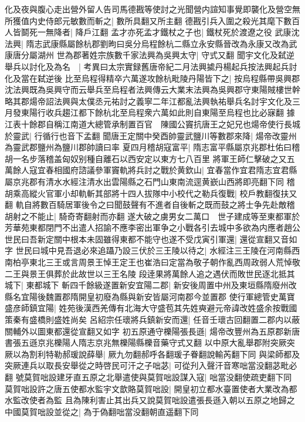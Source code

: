 化及夜與腹心走出營外留人告司馬德戡等使討之光聞營内諠知事覺即襲化及營空無所獲值内史侍郎元敏數而斬之|{
	數所具翻又所主翻}
德戡引兵入圍之殺光其麾下數百人皆鬬死一無降者|{
	降戶江翻}
孟才亦死孟才鐵杖之子也|{
	鐵杖死於渡遼之役}
武康沈法興|{
	隋志武康縣屬餘杭郡劉昫曰吳分烏程餘杭二縣立永安縣晉改為永康又改為武康唐分屬湖州}
世為郡著姓宗族數千家法興為吳興太守|{
	守式又翻}
聞宇文化及弑逆舉兵以討化及為名　|{
	考異曰太宗實録舊唐帝紀二月法興㨿丹楊起兵按法興起兵討化及當在弑逆後}
比至烏程得精卒六萬遂攻餘杭毗陵丹陽皆下之|{
	按烏程縣帶吳興郡沈法興既為吳興守而云舉兵至烏程者法興傳云大業末法興為吳興郡守東陽賊樓世幹略其郡煬帝詔法興與太僕丞元祐討之義寧二年江都亂法興執祐舉兵名討宇文化及三月發東陽行收兵趨江都下餘杭北至烏程衆六萬如此則自東陽至烏程也比必寐翻}
據江表十餘郡自稱江南道大總管承制置百官　陳國公竇抗唐王之妃兄也煬帝使行長城於靈武|{
	行循行也音下孟翻}
聞唐王定關中癸酉帥靈武鹽川等數郡來降|{
	煬帝改靈州為靈武郡鹽州為鹽川郡帥讀曰率}
夏四月稽胡寇富平|{
	隋志富平縣屬京兆郡杜佑曰稽胡一名步落稽盖匈奴别種自離石以西安定以東方七八百里}
將軍王師仁擊破之又五萬餘人寇宜春相國府諮議參軍竇軌將兵討之戰於黄欽山|{
	宜春當作宜君隋志宜君縣屬京兆郡有清水水經注清水出雲陽縣之石門山東南流逕黄嶔山西將即亮翻下同}
稽胡乘高縱火官軍小却軌斬其部將十四人拔隊中小校代之勒兵復戰|{
	校戶教翻復扶又翻}
軌自將數百騎居軍後令之曰聞鼓聲有不進者自後斬之既而鼓之將士争先赴敵稽胡射之不能止|{
	騎奇寄翻射而亦翻}
遂大破之虜男女二萬口　世子建成等至東都軍於芳華苑東都閉門不出遣人招諭不應李密出軍争之小戰各引去城中多欲為内應者趙公世民曰吾新定關中根本未固雖得東都不能守也遂不受戊寅引軍還|{
	還從宣翻又音如字}
世民曰城中見吾退必來追躡乃設三伏於三王陵以待之|{
	水經注三王陵在河南縣西南柏亭東北三王或言周景王悼王定王也崔浩曰定當為敬子朝作亂西周政弱人荒悼敬二王與景王俱葬於此故世以三王名陵}
段逹果將萬餘人追之遇伏而敗世民逐北抵其城下|{
	東都城下}
斬四千餘級遂置新安宜陽二郡|{
	新安後周置中州及東垣縣隋廢州改縣名宜陽後魏置郡隋開皇初廢為縣與新安皆屬河南郡今並置郡}
使行軍總管史萬寶盛彦師鎮宜陽|{
	姓苑後漢西羌傳有北海大守盛苞其先姓奭避元帝諱改姓盛余按戰國策秦有盛橋則盛姓尚矣}
呂紹宗任瓌將兵鎮新安而還|{
	任音壬瓌古回翻置二郡内以蔽關輔外以圖東都還從宣翻又如字}
初五原通守櫟陽張長遜|{
	煬帝改豐州為五原郡新唐書張五遜京兆櫟陽人隋志京兆無櫟陽縣櫟音藥守式又翻}
以中原大亂舉郡附突厥突厥以為割利特勒郝瑗說薛舉|{
	厥九勿翻郝呼各翻瑗子眷翻說輸芮翻下同}
與梁師都及突厥連兵以取長安舉從之時啓民可汗之子咄苾|{
	可從刋入聲汗音寒咄當没翻苾毗必翻}
號莫賀咄設建牙直五原之北舉遣使與莫賀咄設謀入寇|{
	咄當没翻使疏吏翻下同}
莫賀咄設許之唐五使都水監宇文歆賂莫賀咄設|{
	開皇初立都水臺置使者大業改為都水監改使者為監}
且為陳利害止其出兵又說莫賀咄設遣張長遜入朝以五原之地歸之中國莫賀咄設並從之|{
	為于偽翻咄當没翻朝直遥翻下同}
